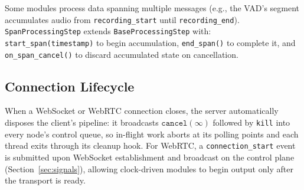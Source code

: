 \documentclass[11pt,a4paper]{article}
\begin{document}
Some modules process data spanning multiple messages (e.g., the VAD's segment accumulates audio from \texttt{recording\_start} until \texttt{recording\_end}). \texttt{SpanProcessingStep} extends \texttt{BaseProcessingStep} with: \texttt{start\_span(timestamp)} to begin accumulation, \texttt{end\_span()} to complete it, and \texttt{on\_span\_cancel()} to discard accumulated state on cancellation.

\subsection{Connection Lifecycle}

When a WebSocket or WebRTC connection closes, the server automatically disposes the client's pipeline: it broadcasts $\texttt{cancel}(\infty)$ followed by \texttt{kill} into every node's control queue, so in-flight work aborts at its polling points and each thread exits through its cleanup hook. For WebRTC, a \texttt{connection\_start} event is submitted upon WebSocket establishment and broadcast on the control plane (Section~\ref{sec:signals}), allowing clock-driven modules to begin output only after the transport is ready.
\end{document}
